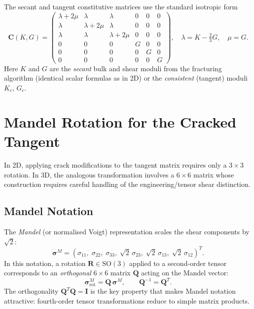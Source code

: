 The secant and tangent constitutive matrices use the standard isotropic form
\begin{equation}
  \mathbf{C}(K, G) =
  \begin{pmatrix}
    \lambda + 2\mu & \lambda & \lambda & 0 & 0 & 0 \\
    \lambda & \lambda + 2\mu & \lambda & 0 & 0 & 0 \\
    \lambda & \lambda & \lambda + 2\mu & 0 & 0 & 0 \\
    0 & 0 & 0 & G & 0 & 0 \\
    0 & 0 & 0 & 0 & G & 0 \\
    0 & 0 & 0 & 0 & 0 & G
  \end{pmatrix}, \quad
  \lambda = K - \tfrac{2}{3}G, \quad
  \mu = G.
  \label{eq:C-iso-3d}
\end{equation}
Here $K$ and $G$ are the \emph{secant} bulk and shear moduli from the
fracturing algorithm (identical scalar formulas as in 2D) or the
\emph{consistent} (tangent) moduli $K_c$, $G_c$.


\section{Mandel Rotation for the Cracked Tangent}
\label{sec:kb3d-mandel}

In 2D, applying crack modifications to the tangent matrix requires only a
$3\times3$ rotation.  In 3D, the analogous transformation involves a
$6\times6$ matrix whose construction requires careful handling of the
engineering/tensor shear distinction.

\subsection{Mandel Notation}

The \emph{Mandel} (or normalised Voigt) representation scales the shear
components by $\sqrt{2}$:
\[
  \boldsymbol{\sigma}^M =
  (\sigma_{11},\;\sigma_{22},\;\sigma_{33},\;
   \sqrt{2}\,\sigma_{23},\;\sqrt{2}\,\sigma_{13},\;\sqrt{2}\,\sigma_{12})^T.
\]
In this notation, a rotation $\mathbf{R} \in \mathrm{SO}(3)$ applied to a
second-order tensor corresponds to an \emph{orthogonal} $6\times6$ matrix
$\mathbf{Q}$ acting on the Mandel vector:
\[
  \boldsymbol{\sigma}^M_{\text{rot}} = \mathbf{Q}\,\boldsymbol{\sigma}^M, \qquad
  \mathbf{Q}^{-1} = \mathbf{Q}^T.
\]
The orthogonality $\mathbf{Q}^T\mathbf{Q} = \mathbf{I}$ is the key property
that makes Mandel notation attractive: fourth-order tensor transformations
reduce to simple matrix products.

